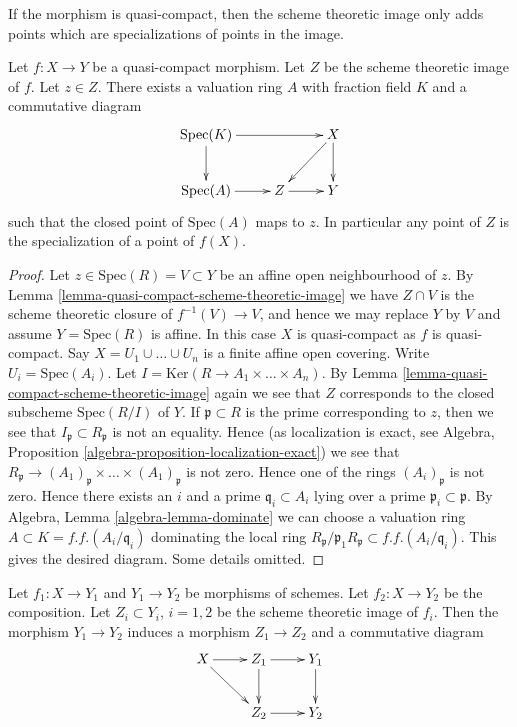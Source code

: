 \noindent
If the morphism is quasi-compact, then the scheme theoretic image only
adds points which are specializations of points in the image.

\begin{lemma}
\label{lemma-reach-points-scheme-theoretic-image}
Let $f : X \to Y$ be a quasi-compact morphism.
Let $Z$ be the scheme theoretic image of $f$.
Let $z \in Z$. There exists a valuation ring $A$ with
fraction field $K$ and a commutative diagram
$$
\xymatrix{
\text{Spec}(K) \ar[rr] \ar[d] & & X \ar[d] \ar[ld] \\
\text{Spec}(A) \ar[r] & Z \ar[r] & Y
}
$$
such that the closed point of $\text{Spec}(A)$ maps to $z$. In particular
any point of $Z$ is the specialization of a point of $f(X)$.
\end{lemma}

\begin{proof}
Let $z \in \text{Spec}(R) = V \subset Y$ be an affine open
neighbourhood of $z$. By
Lemma \ref{lemma-quasi-compact-scheme-theoretic-image}
we have $Z \cap V$ is the scheme theoretic closure of
$f^{-1}(V) \to V$, and hence we may replace $Y$ by $V$
and assume $Y = \text{Spec}(R)$ is affine.
In this case $X$ is quasi-compact as $f$ is quasi-compact.
Say $X = U_1 \cup \ldots \cup U_n$
is a finite affine open covering. Write $U_i = \text{Spec}(A_i)$.
Let $I = \text{Ker}(R \to A_1 \times \ldots \times A_n)$.
By Lemma \ref{lemma-quasi-compact-scheme-theoretic-image}
again we see that $Z$ corresponds to the closed subscheme
$\text{Spec}(R/I)$ of $Y$. If $\mathfrak p \subset R$ is
the prime corresponding to $z$, then we see that
$I_{\mathfrak p} \subset R_{\mathfrak p}$ is not an
equality. Hence (as localization is exact, see
Algebra, Proposition \ref{algebra-proposition-localization-exact})
we see that
$R_{\mathfrak p} \to
(A_1)_{\mathfrak p} \times \ldots \times (A_1)_{\mathfrak p}$
is not zero. Hence one of the rings $(A_i)_{\mathfrak p}$ is not zero.
Hence there exists an $i$ and a prime $\mathfrak q_i \subset A_i$
lying over a prime $\mathfrak p_i \subset \mathfrak p$.
By Algebra, Lemma \ref{algebra-lemma-dominate} we can choose a valuation ring
$A \subset K = f.f.(A_i/\mathfrak q_i)$ dominating
the local ring
$R_{\mathfrak p}/\mathfrak p_1R_{\mathfrak p} \subset f.f.(A_i/\mathfrak q_i)$.
This gives the desired diagram. Some details omitted.
\end{proof}


\begin{lemma}
\label{lemma-factor-factor}
Let $f_1 : X \to Y_1$ and $Y_1 \to Y_2$ be morphisms of schemes.
Let $f_2 : X \to Y_2$ be the composition. Let $Z_i \subset Y_i$, $i = 1, 2$ be
the scheme theoretic image of $f_i$. Then the morphism
$Y_1 \to Y_2$ induces a morphism $Z_1 \to Z_2$ and a
commutative diagram
$$
\xymatrix{
X \ar[r] \ar[rd] & Z_1 \ar[d] \ar[r] & Y_1 \ar[d] \\
& Z_2 \ar[r] & Y_2
}
$$
\end{lemma}

